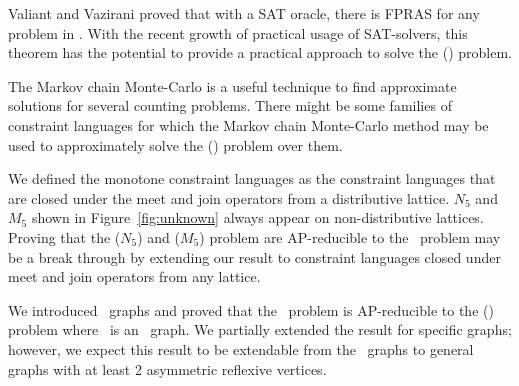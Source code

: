 Valiant and Vazirani \cite{valvaz} proved that with a SAT oracle, there is FPRAS for any 
problem in \cp\@. With the recent growth of practical usage of SAT-solvers, this theorem
has the potential to provide a practical approach to solve the \ccsp(\mrelset) problem.

The Markov chain Monte-Carlo is a useful technique to find approximate solutions for
several counting problems. There might be some families of constraint languages for 
which the Markov chain Monte-Carlo method may be used to approximately solve the 
\ccsp(\mrelset) problem over them.

We defined the monotone constraint languages as the constraint languages that
are closed under the meet and join operators from a distributive lattice.
\(N_5\) and \(M_5\) shown in Figure~\ref{fig:unknown} always appear on non-distributive 
lattices. Proving that the \chom(\(N_5\)) and \chom(\(M_5\)) problem are AP-reducible to
the \cbis\ problem may be a break through by extending  our result to
constraint languages closed under meet and join operators from any lattice.

We introduced \RBA\ graphs and proved that the \cbis\ problem is AP-reducible to
the \chom(\mH) problem where \mH\ is an \RBA\ graph. We partially extended the result
for specific graphs; however, we expect this result to be extendable from the \RBA\ graphs
to general graphs with at least 2 asymmetric reflexive vertices.